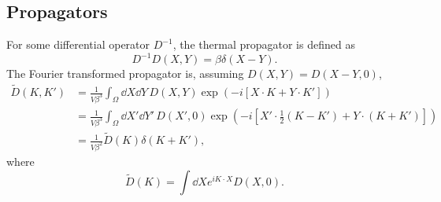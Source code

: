 \subsection*{Propagators}

For some differential operator $D^{-1}$, the thermal propagator is defined as
\begin{equation}
    D^{-1} D(X, Y) = \beta \delta(X - Y).
\end{equation}
The Fourier transformed propagator is, assuming $D(X, Y) = D(X-Y, 0)$,
\begin{align}
    \tilde D(K, K') 
    & = \frac{1}{V \beta^3} \int_{\Omega} \dd X \dd Y \, 
    D(X, Y) \exp(- i [X\cdot K + Y\cdot K']) \\
    & = \frac{1}{V \beta^3} \int_{\Omega} \dd X' \dd Y' \, D(X', 0) 
    \exp(- i [X'\cdot \frac{1}{2} (K - K') + Y\cdot (K + K')]) \\
    & = \frac{1}{V \beta^2} \tilde D(K) \delta(K + K'),
\end{align}
where
\begin{equation}
    \tilde D(K) = \int \dd X e^{iK\cdot X} D(X, 0).
\end{equation}


